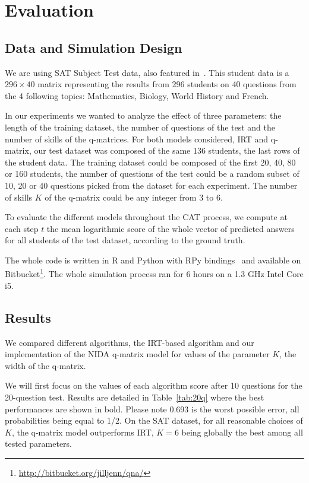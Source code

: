 \documentclass{sig-alternate}
\begin{document}
\section{Evaluation}

\subsection{Data and Simulation Design} %

We are using SAT Subject Test data, also featured in~\citep{Winters2005, Desmarais2011}. This student data is a $296 \times 40$ matrix representing the results from 296 students on 40 questions from the 4 following topics: Mathematics, Biology, World History and French. %

In our experiments we wanted to analyze the effect of three parameters: the length of the training dataset, the number of questions of the test and the number of skills of the q-matrices. For both models considered, IRT and q-matrix, our test dataset was composed of the same 136 students, the last rows of the student data. The training dataset could be composed of the first 20, 40, 80 or 160 students, the number of questions of the test could be a random subset of 10, 20 or 40 questions picked from the dataset for each experiment. The number of skills $K$ of the q-matrix could be any integer from 3 to 6.

To evaluate the different models throughout the CAT process, we compute at each step $t$ the mean logarithmic score of the whole vector of predicted answers for all students of the test dataset, according to the ground truth.

The whole code is written in R and Python with RPy bindings~\citep{Gautier2008} and available on Bitbucket\footnote{\url{http://bitbucket.org/jilljenn/qna/}}. The whole simulation process ran for 6 hours on a 1.3 GHz Intel Core i5.

\subsection{Results}

We compared different algorithms, the IRT-based algorithm and our implementation of the NIDA q-matrix model for values of the parameter $K$, the width of the q-matrix.

We will first focus on the values of each algorithm score after 10 questions for the 20-question test. Results are detailed in Table~\ref{tab:20q} where the best performances are shown in bold. Please note 0.693 is the worst possible error, all probabilities being equal to 1/2. On the SAT dataset, for all reasonable choices of $K$, the q-matrix model outperforms IRT, $K = 6$ being globally the best among all tested parameters.
\end{document}
